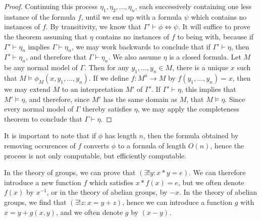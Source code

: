 \begin{proof}
    Continuing this process $\eta_1, \eta_2, \dots, \eta_n$, each successively containing one less instance of the formula $f$, until we end up with a formula $\psi$ which contains no instances of $f$. By transitivity, we know that $\Gamma' \vdash \phi \Leftrightarrow \psi$. It will suffice to prove the theorem assuming that $\eta$ contains no instances of $f$ to being with, because if $\Gamma' \vdash \eta_n$ implies $\Gamma \vdash \eta_n$, we may work backwards to conclude that if $\Gamma' \vdash \eta$, then $\Gamma' \vdash \eta_n$, and therefore that $\Gamma \vdash \eta_n$. We also assume $\eta$ is a closed formula. Let $M$ be any normal model of $\Gamma$. Then for any $y_1, \dots, y_n \in M$, there is a unique $x$ such that $M \vDash \phi_M(x,y_1,\dots,y_n)$. If we define $f: M^n \to M$ by $f(y_1,\dots,y_n) = x$, then we may extend $M$ to an interpretation $M'$ of $\Gamma'$. If $\Gamma' \vdash \eta$, this implies that $M' \vDash \eta$, and therefore, since $M'$ has the same domain as $M$, that $M \vDash \eta$. Since every normal model of $\Gamma$ thereby satisfies $\eta$, we may apply the completeness theorem to conclude that $\Gamma \vdash \eta$.
\end{proof}

It is important to note that if $\phi$ has length $n$, then the formula obtained by removing occurences of $f$ converts $\phi$ to a formula of length $O(n)$, hence the process is not only computable, but efficiently computable.

\begin{example}
    In the theory of groups, we can prove that $(\exists ! y: x * y = e)$. We can therefore introduce a new function $f$ which satisfies $x * f(x) = e$, but we often denote $f(x)$ by $x^{-1}$, or in the theory of abelian groups, by $-x$. In the theory of abelian groups, we find that $(\exists ! z : x = y + z)$, hence we can introduce a function $g$ with $x = y + g(x,y)$, and we often denote $g$ by $(x - y)$.
\end{example}

